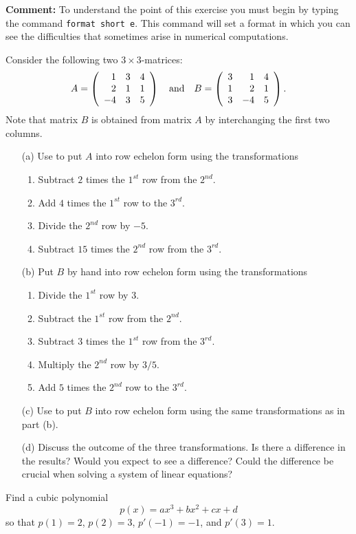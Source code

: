 \documentclass{ximera}
\begin{document}
\begin{exercise} \label{c2.3.4}
{\bf Comment:} {\rm To understand the point of this exercise you
must begin by typing the \Matlab command {\tt format short e}.
This command will set a format in which you can see the
difficulties that sometimes arise in numerical computations.}

Consider the following two $3\times 3$-matrices:
\begin{equation*}
A=\left( \begin{array}{rrr}
     1  &  3  &  4\\
     2  &  1  &  1\\
    -4  &  3  &  5
\end{array}\right) \quad\mbox{and}\quad
B=\left( \begin{array}{rrr}
     3  &  1  &  4\\
     1  &  2  &  1\\
     3  & -4  &  5
\end{array}\right).
\end{equation*}
Note that matrix $B$ is obtained from matrix $A$ by interchanging the
first two columns.
\begin{itemize}
\item[(a)] Use \Matlab to put $A$ into row echelon form using the
transformations
\begin{enumerate}
\item Subtract $2$ times the $1^{st}$ row from the $2^{nd}$.
\item Add $4$ times the $1^{st}$ row to the $3^{rd}$.
\item Divide the $2^{nd}$ row by $-5$.
\item Subtract $15$ times the $2^{nd}$ row from the $3^{rd}$.
\end{enumerate}
\item[(b)] Put $B$ by hand into row echelon form using the
transformations
\begin{enumerate}
\item Divide the $1^{st}$ row by $3$.
\item Subtract the $1^{st}$ row from the $2^{nd}$.
\item Subtract $3$ times the $1^{st}$ row from the $3^{rd}$.
\item Multiply the $2^{nd}$ row by $3/5$.
\item Add $5$ times the $2^{nd}$ row to the $3^{rd}$.
\end{enumerate}
\item[(c)] Use \Matlab to put $B$ into row echelon form using the
same transformations as in part (b).
\item[(d)] Discuss the outcome of the three transformations.  Is
there a difference in the results?  Would you expect to see a
difference?  Could the difference be crucial when solving a system
of linear equations?
\end{itemize}
\end{exercise}

\begin{exercise} \label{c2.3.5}
Find a cubic polynomial
\[
p(x) = ax^3 + bx^2 + cx + d
\]
so that $p(1)=2$, $p(2)=3$, $p'(-1)=-1$, and $p'(3)=1$.
\end{exercise}
\end{document}
